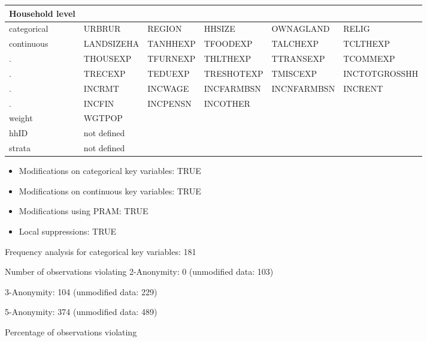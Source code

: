 \documentclass[letterpaper,10pt,english]{sphinxmanual}
\begin{document}
\begin{savenotes}\sphinxattablestart
\centering
\begin{tabulary}{\linewidth}[t]{|T|T|T|T|T|T|}
\hline
\sphinxstyletheadfamily 
Household level
&\sphinxstyletheadfamily &\sphinxstyletheadfamily &\sphinxstyletheadfamily &\sphinxstyletheadfamily &\sphinxstyletheadfamily \\
\hline
categorical
&
URBRUR
&
REGION
&
HHSIZE
&
OWNAGLAND
&
RELIG
\\
\hline
continuous
&
LANDSIZEHA
&
TANHHEXP
&
TFOODEXP
&
TALCHEXP
&
TCLTHEXP
\\
\hline
.
&
THOUSEXP
&
TFURNEXP
&
THLTHEXP
&
TTRANSEXP
&
TCOMMEXP
\\
\hline
.
&
TRECEXP
&
TEDUEXP
&
TRESHOTEXP
&
TMISCEXP
&
INCTOTGROSSHH
\\
\hline
.
&
INCRMT
&
INCWAGE
&
INCFARMBSN
&
INCNFARMBSN
&
INCRENT
\\
\hline
.
&
INCFIN
&
INCPENSN
&
INCOTHER
&&\\
\hline
weight
&
WGTPOP
&&&&\\
\hline
hhID
&
not defined
&&&&\\
\hline
strata
&
not defined
&&&&\\
\hline
\end{tabulary}
\par
\sphinxattableend\end{savenotes}
\begin{itemize}
\item {} 
Modifications on categorical key variables: TRUE

\item {} 
Modifications on continuous key variables: TRUE

\item {} 
Modifications using PRAM: TRUE

\item {} 
Local suppressions: TRUE

\end{itemize}


Frequency analysis for categorical key variables: 181

Number of observations violating
2-Anonymity: 0 (unmodified data: 103)

3-Anonymity: 104 (unmodified data: 229)

5-Anonymity: 374 (unmodified data: 489)

Percentage of observations violating
\end{document}
